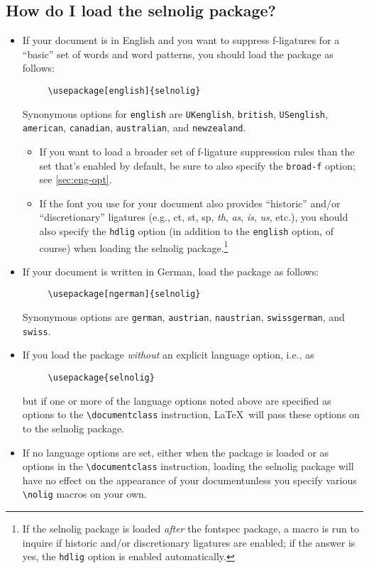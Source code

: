 \documentclass[12pt]{article}
\newcommand{\pkg}[1]{\textsf{#1}}
\newcommand{\opt}[1]{\texttt{#1}}
\newcommand{\cmmd}[1]{\texttt{\textbackslash #1}}
\begin{document}
\subsection[How do I load the selnolig package?]{How do I load the \pkg{selnolig} package?}

\begin{itemize}
\item If your document is in English and you want to suppress f-ligatures for a \enquote{basic} set of words and word patterns, you should load the package as follows:
\begin{Verbatim}
     \usepackage[english]{selnolig}
\end{Verbatim}
Synonymous options for \opt{english} are \opt{UKenglish}, \opt{british}, \opt{USenglish}, \opt{american}, \opt{cana\-dian}, \opt{australian}, and \opt{new\-zealand}.

\begin{itemize}
\item If you want to load a broader set of f-ligature suppression rules than the set that's enabled by default, be sure to also specify the \opt{broad-f} option; see \cref{sec:eng-opt}.

\item If the font you use for your document also provides \enquote{historic} and/or \enquote{discretionary} ligatures (e.g., ct, st, sp, \emph{th}, \emph{as}, \emph{is}, \emph{us}, etc.), you should also specify the \opt{hdlig} option (in addition to the \opt{english} option, of course) when loading the \pkg{selnolig} package.\footnote{If the \pkg{selnolig} package is loaded \emph{after} the \pkg{fontspec} package, a macro is run to inquire if historic and/or discretionary ligatures are enabled; if the answer is yes, the \opt{hdlig} option is enabled automatically.}
\end{itemize}
\item If your document is written in German, load the package as follows:
\begin{Verbatim}
     \usepackage[ngerman]{selnolig}
\end{Verbatim}
Synonymous options are \opt{german}, \opt{austrian}, \opt{naustrian},  \opt{swissgerman}, and \opt{swiss}.

\item If you load the package \emph{without} an explicit language option, i.e., as
\begin{Verbatim}
     \usepackage{selnolig}
\end{Verbatim}
but if one or more of the language options noted above are specified as options to the \cmmd{documentclass} instruction, \LaTeX\ will pass these options on to the \pkg{selnolig} package.

\item If no language options are set, either when the package is loaded or as options in the \cmmd{documentclass} instruction, loading the \pkg{selnolig} package will have no effect on the appearance of your document\textemdash unless you specify various \cmmd{nolig} macros on your own.
\end{itemize}
\end{document}
